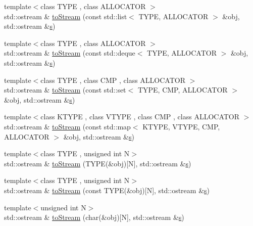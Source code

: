 \begin{DoxyCompactItemize}
\item 
{\footnotesize template$<$class TYPE , class ALLOCATOR $>$ }\\std::ostream \& \hyperlink{namespace_d_d4hep_1_1_utils_a5b757be84d0747306749e83ca9168dc7}{toStream} (const std::list$<$ TYPE, ALLOCATOR $>$ \&obj, std::ostream \&\hyperlink{_volumes_8cpp_a17ca6bfc8040d695d3cada22a4763d40}{s})
\item 
{\footnotesize template$<$class TYPE , class ALLOCATOR $>$ }\\std::ostream \& \hyperlink{namespace_d_d4hep_1_1_utils_a679a69b91363e8a4e5c122fd9cb78d5f}{toStream} (const std::deque$<$ TYPE, ALLOCATOR $>$ \&obj, std::ostream \&\hyperlink{_volumes_8cpp_a17ca6bfc8040d695d3cada22a4763d40}{s})
\item 
{\footnotesize template$<$class TYPE , class CMP , class ALLOCATOR $>$ }\\std::ostream \& \hyperlink{namespace_d_d4hep_1_1_utils_a31e3105c511f5f5e359d2bcc119a64a8}{toStream} (const std::set$<$ TYPE, CMP, ALLOCATOR $>$ \&obj, std::ostream \&\hyperlink{_volumes_8cpp_a17ca6bfc8040d695d3cada22a4763d40}{s})
\item 
{\footnotesize template$<$class KTYPE , class VTYPE , class CMP , class ALLOCATOR $>$ }\\std::ostream \& \hyperlink{namespace_d_d4hep_1_1_utils_ab3abfe8b64637c8b7f60266886d8ab75}{toStream} (const std::map$<$ KTYPE, VTYPE, CMP, ALLOCATOR $>$ \&obj, std::ostream \&\hyperlink{_volumes_8cpp_a17ca6bfc8040d695d3cada22a4763d40}{s})
\item 
{\footnotesize template$<$class TYPE , unsigned int N$>$ }\\std::ostream \& \hyperlink{namespace_d_d4hep_1_1_utils_a17b02e5ffc5536d55bdb8ff38a938543}{toStream} (TYPE(\&obj)\mbox{[}N\mbox{]}, std::ostream \&\hyperlink{_volumes_8cpp_a17ca6bfc8040d695d3cada22a4763d40}{s})
\item 
{\footnotesize template$<$class TYPE , unsigned int N$>$ }\\std::ostream \& \hyperlink{namespace_d_d4hep_1_1_utils_a185388ab1fc3cea027102d8da59b4d06}{toStream} (const TYPE(\&obj)\mbox{[}N\mbox{]}, std::ostream \&\hyperlink{_volumes_8cpp_a17ca6bfc8040d695d3cada22a4763d40}{s})
\item 
{\footnotesize template$<$unsigned int N$>$ }\\std::ostream \& \hyperlink{namespace_d_d4hep_1_1_utils_a89f3b379db439ae144994545375dbe7e}{toStream} (char(\&obj)\mbox{[}N\mbox{]}, std::ostream \&\hyperlink{_volumes_8cpp_a17ca6bfc8040d695d3cada22a4763d40}{s})

\end{DoxyCompactItemize}

